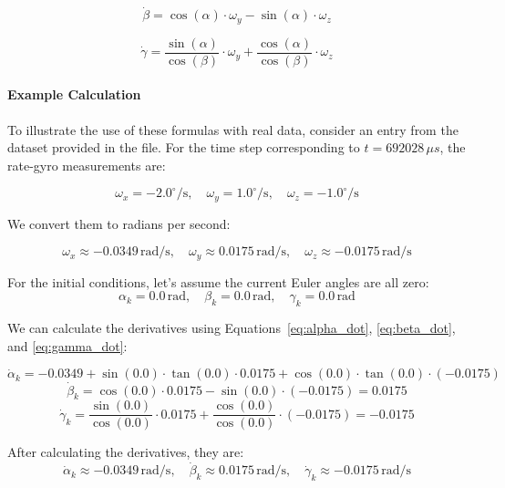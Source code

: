 \documentclass[12pt]{article}
\begin{document}
\begin{equation}
\label{eq:beta_dot}
\dot{\beta} = \cos(\alpha) \cdot \omega_y - \sin(\alpha) \cdot \omega_z
\end{equation}

\begin{equation}
\label{eq:gamma_dot}
\dot{\gamma} = \frac{\sin(\alpha)}{\cos(\beta)} \cdot \omega_y + \frac{\cos(\alpha)}{\cos(\beta)} \cdot \omega_z
\end{equation}

\paragraph{Example Calculation}
To illustrate the use of these formulas with real data, consider an entry from the dataset provided in the file. For the time step corresponding to \( t = 692028 \, \mu s \), the rate-gyro measurements are:

\begin{equation}
\label{eq:rate-gyro}
\omega_x = -2.0^\circ/\text{s}, \quad \omega_y = 1.0^\circ/\text{s}, \quad \omega_z = -1.0^\circ/\text{s}
\end{equation}

We convert them to radians per second:

\begin{equation}
\label{eq:rate-gyro-rad}
\omega_x \approx -0.0349 \, \text{rad/s}, \quad \omega_y \approx 0.0175 \, \text{rad/s}, \quad \omega_z \approx -0.0175 \, \text{rad/s}
\end{equation}

For the initial conditions, let's assume the current Euler angles are all zero:
\[
\alpha_k = 0.0 \, \text{rad}, \quad \beta_k = 0.0 \, \text{rad}, \quad \gamma_k = 0.0 \, \text{rad}
\]

We can calculate the derivatives using Equations~\eqref{eq:alpha_dot}, \eqref{eq:beta_dot}, and \eqref{eq:gamma_dot}:

\[
\dot{\alpha}_k = -0.0349 + \sin(0.0) \cdot \tan(0.0) \cdot 0.0175 + \cos(0.0) \cdot \tan(0.0) \cdot (-0.0175)
\]
\[
\dot{\beta}_k = \cos(0.0) \cdot 0.0175 - \sin(0.0) \cdot (-0.0175) = 0.0175
\]
\[
\dot{\gamma}_k = \frac{\sin(0.0)}{\cos(0.0)} \cdot 0.0175 + \frac{\cos(0.0)}{\cos(0.0)} \cdot (-0.0175) = -0.0175
\]

After calculating the derivatives, they are:
\[
\dot{\alpha}_k \approx -0.0349 \, \text{rad/s}, \quad \dot{\beta}_k \approx 0.0175 \, \text{rad/s}, \quad \dot{\gamma}_k \approx -0.0175 \, \text{rad/s}
\]
\end{document}
